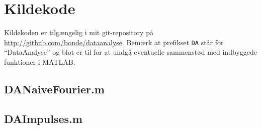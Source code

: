 \documentclass[a4paper, 10pt, danish, final]{article}
\def\repository{\url{http://github.com/bonde/dataanalyse}}
\begin{document}
\appendix
\lstset{language=Matlab, basicstyle=\scriptsize,
    showstringspaces=false, numbers=left, stepnumber=1,
    numberstyle=\tiny, frame=none}
\section{Kildekode}
Kildekoden er tilgængelig i mit git-repository på \repository{}. Bemærk
at prefikset \texttt{DA} står for ``DataAnalyse'' og blot er til for at
undgå eventuelle sammenstød med indbyggede funktioner i MATLAB.

\subsection{DANaiveFourier.m}


\subsection{DAImpulses.m}

\end{document}
